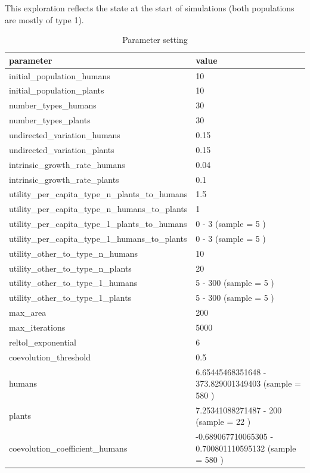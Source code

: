 \documentclass[
]{book}
\begin{document}

This exploration reflects the state at the start of simulations (both populations are mostly of type 1).

\begin{table}[!h]

\caption{\label{tab:4Ub1mU1tablepdf}Parameter setting}
\centering
\begin{tabular}[t]{l|l}
\hline
parameter & value\\
\hline
initial\_population\_humans & 10\\
\hline
initial\_population\_plants & 10\\
\hline
number\_types\_humans & 30\\
\hline
number\_types\_plants & 30\\
\hline
undirected\_variation\_humans & 0.15\\
\hline
undirected\_variation\_plants & 0.15\\
\hline
intrinsic\_growth\_rate\_humans & 0.04\\
\hline
intrinsic\_growth\_rate\_plants & 0.1\\
\hline
utility\_per\_capita\_type\_n\_plants\_to\_humans & 1.5\\
\hline
utility\_per\_capita\_type\_n\_humans\_to\_plants & 1\\
\hline
utility\_per\_capita\_type\_1\_plants\_to\_humans & 0 - 3 (sample = 5 )\\
\hline
utility\_per\_capita\_type\_1\_humans\_to\_plants & 0 - 3 (sample = 5 )\\
\hline
utility\_other\_to\_type\_n\_humans & 10\\
\hline
utility\_other\_to\_type\_n\_plants & 20\\
\hline
utility\_other\_to\_type\_1\_humans & 5 - 300 (sample = 5 )\\
\hline
utility\_other\_to\_type\_1\_plants & 5 - 300 (sample = 5 )\\
\hline
max\_area & 200\\
\hline
max\_iterations & 5000\\
\hline
reltol\_exponential & 6\\
\hline
coevolution\_threshold & 0.5\\
\hline
humans & 6.65445468351648 - 373.829001349403 (sample = 580 )\\
\hline
plants & 7.25341088271487 - 200 (sample = 22 )\\
\hline
coevolution\_coefficient\_humans & -0.689067710065305 - 0.700801110595132 (sample = 580 )\\

\end{tabular}
\end{table}
\end{document}
